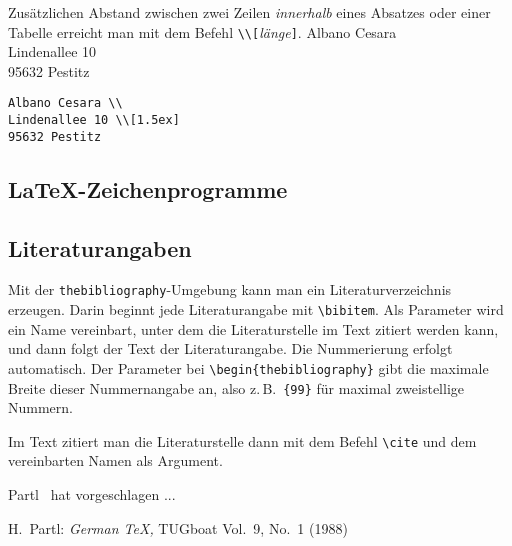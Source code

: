 Zusätzlichen Abstand zwischen zwei Zeilen \emph{innerhalb}
eines Absatzes oder einer Tabelle erreicht man mit dem Befehl
\lstinline|\\[|\textit{länge}\lstinline|]|.
\exa
Albano Cesara \\
Lindenallee 10 \\[1.5ex]
95632 Pestitz
\exb
\begin{verbatim}
Albano Cesara \\
Lindenallee 10 \\[1.5ex]
95632 Pestitz
\end{verbatim}
\exc

\smallskip

\subsection{\LaTeX-Zeichenprogramme}


 

\subsection{Literaturangaben}

Mit der \texttt{thebibliography}-Umgebung kann man ein
Literaturverzeichnis erzeugen.
Darin beginnt jede Literaturangabe mit \lstinline|\bibitem|.
Als Parameter wird ein Name vereinbart, unter dem die
Literaturstelle im Text zitiert werden kann, und
dann folgt der Text der Literaturangabe.
Die Nummerierung erfolgt automatisch.
Der Parameter bei \lstinline|\begin{thebibliography}| gibt die
maximale Breite dieser Nummernangabe an, also z.\,B.\ 
\lstinline|{99}| für maximal zweistellige Nummern.

Im Text zitiert man die Literaturstelle dann mit dem Befehl \lstinline|\cite|
und dem vereinbarten Namen als Argument.

\let\origcite\cite
\begin{LTXexample}[preset=\let\cite\origcite]
Partl~\cite{pa} hat
vorgeschlagen ...
 
\begin{thebibliography}{99}
H.~Partl: \textit{German \TeX,}
TUGboat Vol.~9, No.~1 (1988)
\end{thebibliography}
\end{LTXexample}

